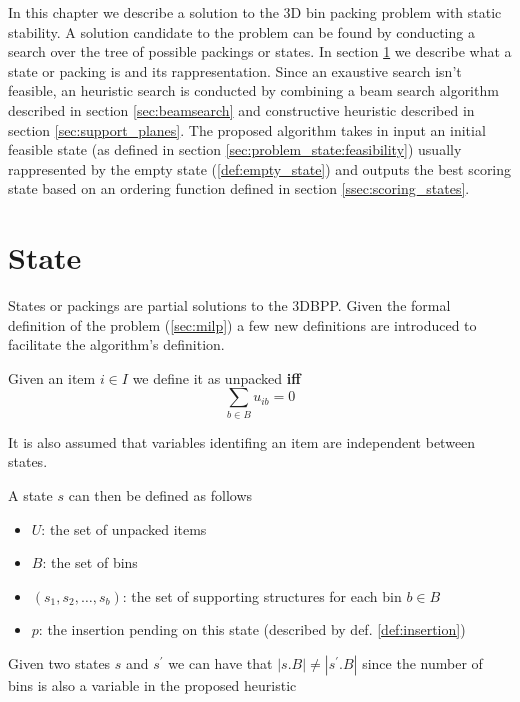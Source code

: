 In this chapter we describe a solution to the 3D bin packing problem with static stability.
A solution candidate to the problem can be found by conducting a search over the tree of possible packings or states. In section \ref{sec:problem_state} we describe what a state or packing is and its rappresentation.
Since an exaustive search isn't feasible, an heuristic search is conducted by combining a beam search algorithm described in section \ref{sec:beamsearch} and constructive heuristic described in section \ref{sec:support_planes}.
The proposed algorithm takes in input an initial feasible state (as defined in section \ref{sec:problem_state:feasibility}) usually rappresented by the empty state (\ref{def:empty_state}) and outputs the best scoring state based on an ordering function defined in section \ref{ssec:scoring_states}.

\section{State}
\label{sec:problem_state}%
States or packings are partial solutions to the 3DBPP. Given the formal definition of the problem (\ref{sec:milp}) a few new definitions are introduced to facilitate the algorithm's definition.
\begin{definition}
    Given an item $i \in I$ we define it as unpacked \textbf{iff}
    \begin{equation*}
        \sum_{b \in B} u_{ib} = 0
    \end{equation*}
\end{definition}

It is also assumed that variables identifing an item are independent between states.

A state $s$ can then be defined as follows
\begin{itemize}
    \item $U$: the set of unpacked items
    \item $B$: the set of bins
    \item $(s_1, s_2,\dots, s_b)$: the set of supporting structures for each bin $b \in B$
    \item $p$: the insertion pending on this state (described by def. \ref{def:insertion})
\end{itemize}

\begin{observation}
    Given two states $s$ and $s^\prime$ we can have that $|s.B| \neq |s^\prime.B|$ since the number of bins is also a variable in the proposed heuristic
\end{observation}

